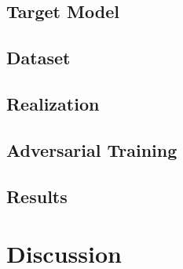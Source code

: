 \subsection{Target Model} 


\subsection{Dataset} 



\subsection{Realization}


\subsection{Adversarial Training}









\subsection{Results}


\section{Discussion}



